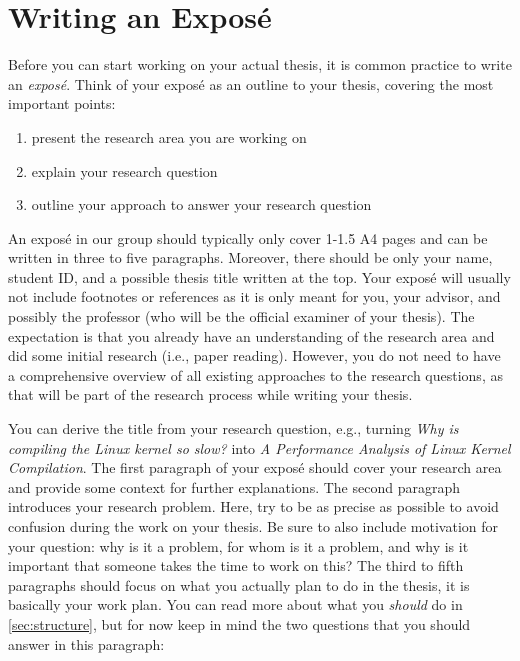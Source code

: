 \documentclass[a4paper]{article}
\begin{document}
\section{Writing an Expos\'e}
\label{sec:expose}

Before you can start working on your actual thesis, it is common practice to write an \emph{expos\'e}.
Think of your expos\'e as an outline to your thesis, covering the most important points:

\begin{enumerate}
    \item present the research area you are working on
    \item explain your research question
    \item outline your approach to answer your research question
\end{enumerate}

An expos\'e in our group should typically only cover 1-1.5 A4 pages and can be written in three to five paragraphs.
Moreover, there should be only your name, student ID, and a possible thesis title written at the top.
Your expos\'e will usually not include footnotes or references as it is only meant for you, your advisor, and possibly the professor (who will be the official examiner of your thesis).
The expectation is that you already have an understanding of the research area and did some initial research (i.e., paper reading).
However, you do not need to have a comprehensive overview of all existing approaches to the research questions, as that will be part of the research process while writing your thesis.

You can derive the title from your research question, e.g., turning \emph{Why is compiling the Linux kernel so slow?} into \emph{A Performance Analysis of Linux Kernel Compilation}.
The first paragraph of your expos\'e should cover your research area and provide some context for further explanations.
The second paragraph introduces your research problem.
Here, try to be as precise as possible to avoid confusion during the work on your thesis.
Be sure to also include motivation for your question: why is it a problem, for whom is it a problem, and why is it important that someone takes the time to work on this?
The third to fifth paragraphs should focus on what you actually plan to do in the thesis, it is basically your work plan.
You can read more about what you \emph{should} do in \cref{sec:structure}, but for now keep in mind the two questions that you should answer in this paragraph:
\end{document}
